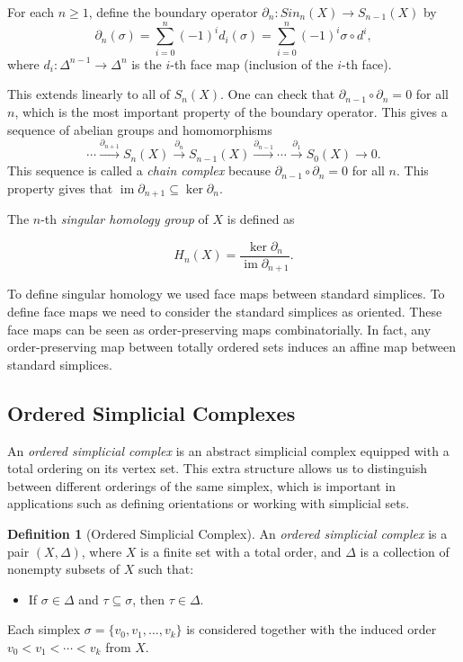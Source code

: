 \documentclass[11pt]{article}
\theoremstyle{definition}
\newtheorem{definition}{Definition}[section]
\theoremstyle{plain}
\begin{document}
For each $n \geq 1$, define the boundary operator $\partial_n : Sin_n(X) \to S_{n-1}(X)$ by
\[
    \partial_n(\sigma) = \sum_{i=0}^n (-1)^i d_i(\sigma) = \sum_{i=0}^n (-1)^i \sigma \circ d^i,
\]
where $d_i : \Delta^{n-1} \to \Delta^n$ is the $i$-th face map (inclusion of the $i$-th face).

This extends linearly to all of $S_n(X)$. One can check that $\partial_{n-1} \circ \partial_n = 0$ for all $n$, which is the most important property of the boundary operator.
This gives  a sequence of abelian groups and homomorphisms
\[
    \cdots \xrightarrow{\partial_{n+1}} S_n(X) \xrightarrow{\partial_n} S_{n-1}(X) \xrightarrow{\partial_{n-1}} \cdots \xrightarrow{\partial_1} S_0(X) \to 0.
\]
This sequence is called a \emph{ chain complex}  because $\partial_{n-1} \circ \partial_n = 0$ for all $n$. This property gives that  $\operatorname{im} \partial_{n+1} \subseteq \ker \partial_n$.

The $n$-th \emph{singular homology group} of $X$ is defined as

\[
    H_n(X) = \frac{\ker \partial_n}{\operatorname{im} \partial_{n+1}}.
\]

To define singular homology we used face maps between standard simplices. To define face maps we need to consider the standard simplices as oriented. These face maps can be seen as  order-preserving maps combinatorially. In fact, any order-preserving map between totally ordered sets induces an affine map between standard simplices.

\subsection{Ordered Simplicial Complexes}

An \emph{ordered simplicial complex} is an abstract simplicial complex equipped with a total ordering on its vertex set. This extra structure allows us to distinguish between different orderings of the same simplex, which is important in applications such as defining orientations or working with simplicial sets.

\begin{definition}[Ordered Simplicial Complex]
    An \emph{ordered simplicial complex} is a pair $(X, \Delta)$, where $X$ is a finite set with a total order, and $\Delta$ is a collection of nonempty subsets of $X$ such that:
    \begin{itemize}
        \item If $\sigma \in \Delta$ and $\tau \subseteq \sigma$, then $\tau \in \Delta$.
    \end{itemize}
    Each simplex $\sigma = \{v_0, v_1, \ldots, v_k\}$ is considered together with the induced order $v_0 < v_1 < \cdots < v_k$ from $X$.
\end{definition}
\end{document}
